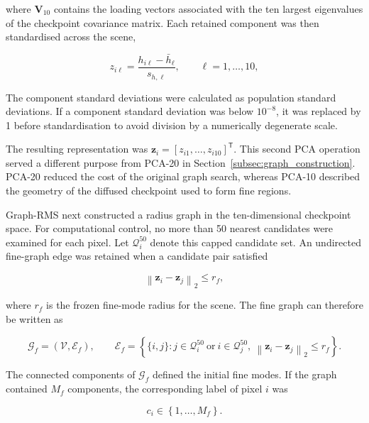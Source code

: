 \documentclass[10pt,a4paper,fleqn]{article}
\begin{document}
where \(\mathbf{V}_{10}\) contains the loading vectors associated with the ten
largest eigenvalues of the checkpoint covariance matrix. Each retained
component was then standardised across the scene,

\begin{equation}
z_{i\ell}
=
\frac{h_{i\ell}-\bar{h}_{\ell}}
{s_{h,\ell}},
\qquad
\ell=1,\ldots,10,
\label{eq:fine_standardisation}
\end{equation}

The component standard deviations were calculated as population standard
deviations. If a component standard deviation was below \(10^{-8}\), it was
replaced by 1 before standardisation to avoid division by a numerically
degenerate scale.

The resulting representation was
\(\mathbf{z}_i=[z_{i1},\ldots,z_{i10}]^{\mathsf T}\). This second PCA operation
served a different purpose from PCA-20 in Section~\ref{subsec:graph_construction}.
PCA-20 reduced the cost of the original graph search, whereas PCA-10 described
the geometry of the diffused checkpoint used to form fine regions.

Graph-RMS next constructed a radius graph in the ten-dimensional checkpoint
space. For computational control, no more than 50 nearest candidates were
examined for each pixel. Let \(\mathcal{Q}^{50}_i\) denote this capped candidate
set. An undirected fine-graph edge was retained when a candidate pair satisfied

\begin{equation}
\left\|
\mathbf{z}_i-\mathbf{z}_j
\right\|_2
\leq r_f,
\label{eq:fine_radius_condition}
\end{equation}

where \(r_f\) is the frozen fine-mode radius for the scene. The fine graph can
therefore be written as

\begin{equation}
\mathcal{G}_{f}
=
\left(
\mathcal{V},
\mathcal{E}_{f}
\right),
\qquad
\mathcal{E}_{f}
=
\left\{
\{i,j\}:
j\in\mathcal{Q}^{50}_i
\ \text{or}\
i\in\mathcal{Q}^{50}_j,
\
\left\|
\mathbf{z}_i-\mathbf{z}_j
\right\|_2
\leq r_f
\right\}.
\label{eq:fine_graph}
\end{equation}

The connected components of \(\mathcal{G}_{f}\) defined the initial fine
modes. If the graph contained \(M_f\) components, the corresponding label of
pixel \(i\) was

\begin{equation}
c_i
\in
\left\{
1,\ldots,M_f
\right\}.
\label{eq:fine_labels}
\end{equation}
\end{document}

